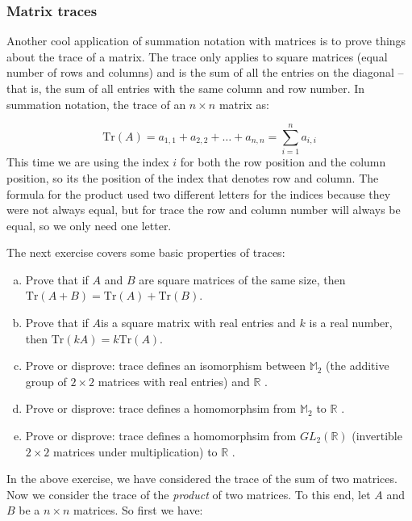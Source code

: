 \subsubsection*{Matrix traces}
Another cool application of summation notation with matrices is to prove things about the {\bfi trace} of a matrix.  The trace only applies to square matrices (equal number of rows and columns) and is the sum of all the entries on the diagonal -- that is,  the sum of all entries with the same column and row number.  In summation notation, the trace of an $n \times n$ matrix as:

\[ \text{Tr} \left( A \right)= a_{1,1} + a_{2,2} + \ldots + a_{n,n} = \sum_{i=1}^n a_{i,i} \] 
This time we are using the index $i$ for both the row position and the column position, so its the position of the index that denotes row and column.  The formula for the product used two different letters for the indices because they were not always equal, but for trace the row and column number will always be equal, so we only need one letter.

The next exercise covers some basic properties of traces:

\begin{exercise}
\begin{enumerate}[(a)]
\item
Prove that if $A$ and $B$ are square matrices of the same size, then $\text{Tr} \left( A + B \right) = \text{Tr} \left( A \right) + \text{Tr} \left( B \right)$.
\item
Prove that if $A $is a square matrix with real entries and $k$ is a real number, then $\text{Tr} \left(k A  \right) = k\text{Tr} \left( A \right)$.
\item
Prove or disprove: trace defines an isomorphism between $\mathbb{M}_2$ (the additive group of $2 \times 2$ matrices with real entries) and $\mathbb{R}$ .
\item
Prove or disprove: trace defines a homomorphsim from $\mathbb{M}_2$ to $\mathbb{R}$ .
\item
Prove or disprove: trace defines a homomorphsim from $GL_2(\mathbb{R})$ (invertible $2 \times 2$ matrices under multiplication)  to $\mathbb{R}$ .
\end{enumerate}
\end{exercise}


In the above exercise, we have considered the trace of the sum of two matrices. Now we consider the trace of the \emph{product} of two matrices.  To this end, let ${A}$ and  ${B}$ be a $n \times n$ matrices.  So first we have:

